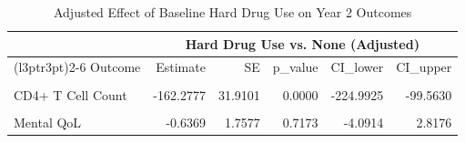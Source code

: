 \begin{table}[!h]
\centering
\caption{\label{tab:freq-table}Adjusted Effect of Baseline Hard Drug Use on Year 2 Outcomes}
\centering
\begin{tabular}[t]{lrrrrr}
\toprule
\multicolumn{1}{c}{ } & \multicolumn{5}{c}{Hard Drug Use vs. None (Adjusted)} \\
\cmidrule(l{3pt}r{3pt}){2-6}
Outcome & Estimate & SE & p\_value & CI\_lower & CI\_upper\\
\midrule
\cellcolor{gray!10}{Log10 Viral Load} & \cellcolor{gray!10}{-0.0023} & \cellcolor{gray!10}{0.2042} & \cellcolor{gray!10}{0.9911} & \cellcolor{gray!10}{-0.4036} & \cellcolor{gray!10}{0.3990}\\
CD4+ T Cell Count & -162.2777 & 31.9101 & 0.0000 & -224.9925 & -99.5630\\
\cellcolor{gray!10}{Physical QoL} & \cellcolor{gray!10}{-3.2239} & \cellcolor{gray!10}{1.4087} & \cellcolor{gray!10}{0.0226} & \cellcolor{gray!10}{-5.9926} & \cellcolor{gray!10}{-0.4553}\\
Mental QoL & -0.6369 & 1.7577 & 0.7173 & -4.0914 & 2.8176\\
\bottomrule
\end{tabular}
\end{table}

